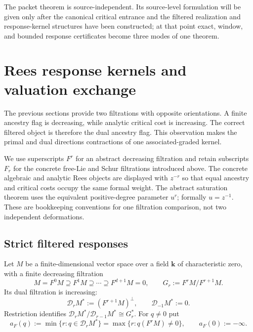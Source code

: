 \documentclass[10pt,reqno]{amsart}
\theoremstyle{plain}
\theoremstyle{definition}
\theoremstyle{remark}
\begin{document}
The packet theorem is source-independent.  Its source-level
formulation will be given only after the canonical critical entrance and the
filtered realization and response-kernel structures have been constructed;
at that point exact, window, and bounded response certificates become three
modes of one theorem.
\section{Rees response kernels and valuation exchange}
\label{rk:sec-kernel}

The previous sections provide two filtrations with opposite orientations.  A
finite ancestry flag is decreasing, while analytic critical cost is
increasing.  The correct filtered object is therefore the dual ancestry
flag.  This observation makes the primal and dual directions contractions of
one associated-graded kernel.

We use superscripts $F^r$ for an abstract decreasing filtration and retain
subscripts $F_r$ for the concrete free-Lie and Schur filtrations introduced
above.  The concrete algebraic and analytic Rees objects are displayed with
$z^{-r}$ so that equal ancestry and critical costs occupy the same formal
weight.  The abstract saturation theorem uses the equivalent positive-degree
parameter $u^r$; formally $u=z^{-1}$.  These are bookkeeping conventions for
one filtration comparison, not two independent deformations.

\subsection{Strict filtered responses}
\label{rk:subsec-strict}

Let $M$ be a finite-dimensional vector space over a field $\mathbf k$ of
characteristic zero, with a finite decreasing filtration
\begin{equation}
 M=F^0M\supseteq F^1M\supseteq\cdots\supseteq F^{d+1}M=0,
 \qquad G_r:=F^rM/F^{r+1}M.
 \label{rk:eq-source-filtration}
\end{equation}
Its dual filtration is increasing:
\begin{equation}
 \mathscr D_rM^*:=(F^{r+1}M)^\perp,
 \qquad \mathscr D_{-1}M^*:=0.
 \label{rk:eq-dual-filtration}
\end{equation}
Restriction identifies
$\mathscr D_rM^*/\mathscr D_{r-1}M^*\cong G_r^*$.  For $q\ne0$ put
\begin{equation}
 a_F(q):=\min\{r:q\in\mathscr D_rM^*\}
       =\max\{r:q(F^rM)\ne0\},
 \qquad a_F(0):=-\infty.
 \label{rk:eq-algebraic-depth}
\end{equation}
\end{document}
